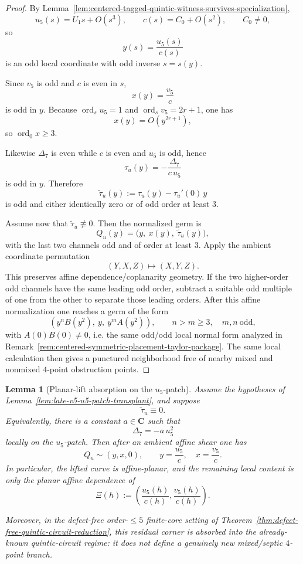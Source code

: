 \documentclass[11pt,a4paper]{amsart}
\theoremstyle{plain}
\newtheorem{lemma}[theorem]{Lemma}
\theoremstyle{definition}
\begin{document}
\begin{proof}
By Lemma~\ref{lem:centered-tagged-quintic-witness-survives-specialization},
\[
u_5(s)=U_1s+O(s^3),
\qquad
c(s)=C_0+O(s^2),
\qquad
C_0\neq 0,
\]
so
\[
y(s)=\frac{u_5(s)}{c(s)}
\]
is an odd local coordinate with odd inverse $s=s(y)$.

Since $v_5$ is odd and $c$ is even in $s$,
\[
x(y)=\frac{v_5}{c}
\]
is odd in $y$. Because $\operatorname{ord}_s u_5=1$ and
$\operatorname{ord}_s v_5=2r+1$, one has
\[
x(y)=O(y^{2r+1}),
\]
so $\operatorname{ord}_0x\ge 3$.

Likewise $\Delta_7$ is even while $c$ is even and $u_5$ is odd, hence
\[
\tau_u(y)=-\frac{\Delta_7}{c\,u_5}
\]
is odd in $y$. Therefore
\[
\widetilde\tau_u(y):=\tau_u(y)-\tau_u'(0)\,y
\]
is odd and either identically zero or of odd order at least $3$.

Assume now that $\widetilde\tau_u\not\equiv 0$. Then the normalized germ is
\[
Q_u(y)=\bigl(y,\ x(y),\ \widetilde\tau_u(y)\bigr),
\]
with the last two channels odd and of order at least $3$. Apply the ambient
coordinate permutation
\[
(Y,X,Z)\longmapsto (X,Y,Z).
\]
This preserves affine dependence/coplanarity geometry. If the two higher-order
odd channels have the same leading odd order, subtract a suitable odd multiple
of one from the other to separate those leading orders. After this affine
normalization one reaches a germ of the form
\[
(y^nB(y^2),\ y,\ y^mA(y^2)),
\qquad
n>m\ge 3,\quad m,n\ \text{odd},
\]
with $A(0)B(0)\neq 0$, i.e. the same odd/odd local normal form analyzed in
Remark~\ref{rem:centered-symmetric-placement-taylor-package}. The same local
calculation then gives a punctured neighborhood free of nearby mixed and
nonmixed $4$-point obstruction points.
\end{proof}

\begin{lemma}[Planar-lift absorption on the $u_5$-patch]
\label{lem:planar-lift-absorption-u5-patch}
Assume the hypotheses of
Lemma~\ref{lem:late-v5-u5-patch-transplant}, and suppose
\[
\widetilde\tau_u\equiv 0.
\]
Equivalently, there is a constant $a\in\mathbf C$ such that
\[
\Delta_7=-a\,u_5^2
\]
locally on the $u_5$-patch. Then after an ambient affine shear one has
\[
Q_u\sim (y,x,0),
\qquad
y=\frac{u_5}{c},
\quad
x=\frac{v_5}{c}.
\]
In particular, the lifted curve is affine-planar, and the remaining local
content is only the planar affine dependence of
\[
\Xi(h):=\left(\frac{u_5(h)}{c(h)},\frac{v_5(h)}{c(h)}\right).
\]

Moreover, in the defect-free order-$\le 5$ finite-core setting of
Theorem~\ref{thm:defect-free-quintic-circuit-reduction}, this residual corner is
absorbed into the already-known quintic-circuit regime: it does not define a
genuinely new mixed/septic $4$-point branch.
\end{lemma}
\end{document}
